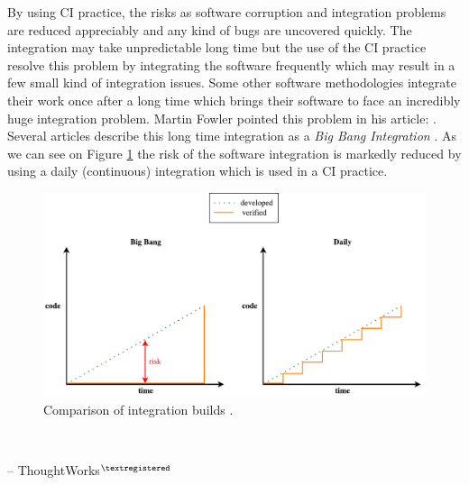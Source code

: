 By using CI practice, the risks as software corruption and integration problems are reduced appreciably and any kind of bugs are uncovered quickly. The integration may take unpredictable long time but the use of the CI practice resolve this problem by integrating the software frequently which may result in a few small kind of integration issues. Some other software methodologies integrate their work once after a long time which brings their software to face an incredibly huge integration problem. Martin Fowler pointed this problem in his article:  \cite{MartinFowler}. Several articles describe this long time integration as a \textit{Big Bang Integration} \cite{AaltoUniversity}. As we can see on Figure \ref{fig:integration} the risk of the software integration is markedly reduced by using a daily (continuous) integration which is used in a CI practice.

\begin{figure}[H]
    \centering
    \includegraphics[scale=0.5]{img/big_bang_vs_daily_build.pdf}
    \caption{Comparison of integration builds \cite{AaltoUniversity}.}
    \label{fig:integration}
\end{figure}

\begin{displayquote}
    \textit{}\\[-2em]
    \begin{flushright}
        -- ThoughtWorks$^{\tiny{\textregistered}}$ \cite{ThoughtWorks}
    \end{flushright}
\end{displayquote}

